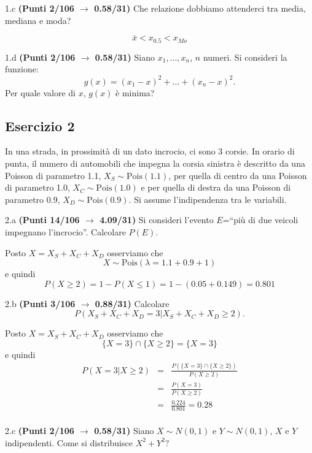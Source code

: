 \documentclass[
  11pt,
]{book}
\theoremstyle{mytheoremstyle}
\theoremstyle{mydefstyle}
\newenvironment{sol}
  {
  \begin{tcolorbox}[enhanced,breakable,arc=0.1mm,boxrule=1pt,colback=white,colframe=iblue,
  title=\bf \fontfamily{lmss}\selectfont \hspace{.5 cm} Soluzione,drop fuzzy shadow]

}{
\end{tcolorbox}
  }
\begin{document}
1.c \textbf{(Punti 2/106 \(\rightarrow\) 0.58/31)} Che relazione dobbiamo attenderci tra media, mediana e moda?

\begin{sol}
\[\bar x<x_{0.5}<x_{Mo}\]

\end{sol}

1.d \textbf{(Punti 2/106 \(\rightarrow\) 0.58/31)} Siano \(x_1,...,x_n\), \(n\) numeri. Si consideri la funzione:
\[g(x)=(x_1-x)^2+...+(x_n-x)^2.\]
Per quale valore di \(x\), \(g(x)\) è minima?

\subsection{Esercizio 2}\label{esercizio-2-18}

In una strada, in prossimità di un dato incrocio, ci sono 3 corsie.
In orario di punta, il numero di automobili che impegna la corsia sinistra è descritto
da una Poisson di parametro 1.1, \(X_S\sim\text{Pois}(1.1)\), per quella di centro da una Poisson di parametro 1.0, \(X_C\sim\text{Pois}(1.0)\) e per quella di destra da una Poisson di parametro 0.9, \(X_D\sim\text{Pois}(0.9)\). Si assume l'indipendenza tra le variabili.

2.a \textbf{(Punti 14/106 \(\rightarrow\) 4.09/31)} Si consideri l'evento \(E\)=``più di due veicoli
impegnano l'incrocio''. Calcolare \(P(E)\).

\begin{sol}
Posto \(X=X_S+X_C+X_D\) osserviamo che
\[X\sim\text{Pois}(\lambda=1.1+0.9+1)\]
e quindi
\[P(X\ge 2)=1-P(X\le 1)=1-(0.05+0.149)=0.801\]

\end{sol}

2.b \textbf{(Punti 3/106 \(\rightarrow\) 0.88/31)} Calcolare
\[
P(X_S+X_C+X_D=3|X_S+X_C+X_D\ge 2).
\]

\begin{sol}
Posto \(X=X_S+X_C+X_D\) osserviamo che
\[\{X=3\}\cap\{X \ge 2\}=\{X=3\}\]
e quindi
\begin{eqnarray*}
  P(X=3|X\ge 2) &=&  \frac{P(\{X=3\}\cap\{X \ge 2\})}{P(X \ge 2)}\\
  &=&\frac{P(X=3)}{P(X \ge 2)}\\
  &=&\frac{0.224}{0.801}=0.28\\
\end{eqnarray*}

\end{sol}

2.c \textbf{(Punti 2/106 \(\rightarrow\) 0.58/31)} Siano \(X\sim N(0,1)\) e \(Y\sim N(0,1)\), \(X\) e \(Y\) indipendenti.
Come si distribuisce \(X^2+Y^2\)?
\end{document}
